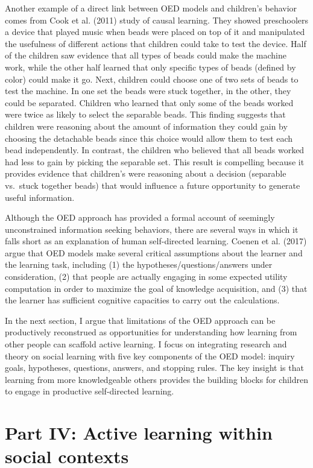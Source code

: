 \documentclass[english,floatsintext,man]{apa6}
\theoremstyle{definition}
\theoremstyle{definition}
\theoremstyle{definition}
\theoremstyle{remark}
\begin{document}
Another example of a direct link between OED models and children's
behavior comes from Cook et al. (2011) study of causal learning. They
showed preschoolers a device that played music when beads were placed on
top of it and manipulated the usefulness of different actions that
children could take to test the device. Half of the children saw
evidence that all types of beads could make the machine work, while the
other half learned that only specific types of beads (defined by color)
could make it go. Next, children could choose one of two sets of beads
to test the machine. In one set the beads were stuck together, in the
other, they could be separated. Children who learned that only some of
the beads worked were twice as likely to select the separable beads.
This finding suggests that children were reasoning about the amount of
information they could gain by choosing the detachable beads since this
choice would allow them to test each bead independently. In contrast,
the children who believed that all beads worked had less to gain by
picking the separable set. This result is compelling because it provides
evidence that children's were reasoning about a decision (separable
vs.~stuck together beads) that would influence a future opportunity to
generate useful information.

Although the OED approach has provided a formal account of seemingly
unconstrained information seeking behaviors, there are several ways in
which it falls short as an explanation of human self-directed learning.
Coenen et al. (2017) argue that OED models make several critical
assumptions about the learner and the learning task, including (1) the
hypotheses/questions/answers under consideration, (2) that people are
actually engaging in some expected utility computation in order to
maximize the goal of knowledge acquisition, and (3) that the learner has
sufficient cognitive capacities to carry out the calculations.

In the next section, I argue that limitations of the OED approach can be
productively reconstrued as opportunities for understanding how learning
from other people can scaffold active learning. I focus on integrating
research and theory on social learning with five key components of the
OED model: inquiry goals, hypotheses, questions, answers, and stopping
rules. The key insight is that learning from more knowledgeable others
provides the building blocks for children to engage in productive
self-directed learning.

\hypertarget{p4}{\section{Part IV: Active learning within social
contexts}\label{p4}}
\end{document}
